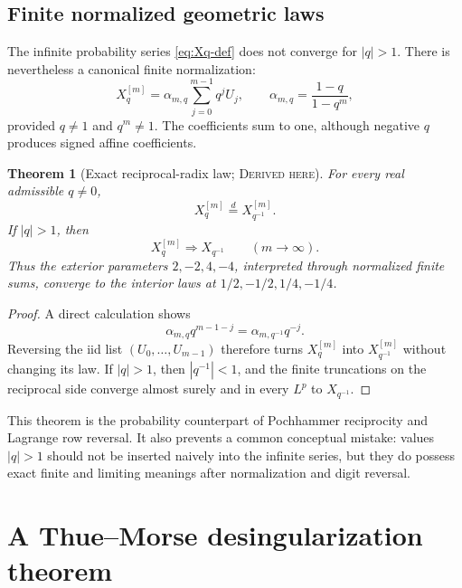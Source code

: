 \documentclass[11pt,oneside]{article}
\newtheorem{theorem}{Theorem}[section]
\theoremstyle{definition}
\theoremstyle{remark}
\newcommand{\Derived}{\textsc{Derived here}}
\begin{document}
\subsection{Finite normalized geometric laws}
The infinite probability series \eqref{eq:Xq-def} does not converge for
\(|q|>1\).  There is nevertheless a canonical finite normalization:
\begin{equation}\label{eq:finite-law}
 X_q^{[m]}=\alpha_{m,q}\sum_{j=0}^{m-1}q^jU_j,
 \qquad
 \alpha_{m,q}=\frac{1-q}{1-q^m},
\end{equation}
provided \(q\ne1\) and \(q^m\ne1\).  The coefficients sum to one, although
negative \(q\) produces signed affine coefficients.

\begin{theorem}[Exact reciprocal-radix law; \Derived]\label{thm:finite-reciprocal}
For every real admissible \(q\ne0\),
\begin{equation}\label{eq:finite-reciprocal}
 X_q^{[m]}\stackrel d=X_{q^{-1}}^{[m]}.
\end{equation}
If \(|q|>1\), then
\begin{equation}\label{eq:outside-limit}
 X_q^{[m]}\Longrightarrow X_{q^{-1}}
 \qquad(m\to\infty).
\end{equation}
Thus the exterior parameters \(2,-2,4,-4\), interpreted through normalized
finite sums, converge to the interior laws at \(1/2,-1/2,1/4,-1/4\).
\end{theorem}

\begin{proof}
A direct calculation shows
\[
 \alpha_{m,q}q^{m-1-j}=\alpha_{m,q^{-1}}q^{-j}.
\]
Reversing the iid list \((U_0,\ldots,U_{m-1})\) therefore turns
\(X_q^{[m]}\) into \(X_{q^{-1}}^{[m]}\) without changing its law.  If
\(|q|>1\), then \(|q^{-1}|<1\), and the finite truncations on the reciprocal
side converge almost surely and in every \(L^p\) to \(X_{q^{-1}}\).
\end{proof}

This theorem is the probability counterpart of Pochhammer reciprocity and
Lagrange row reversal.  It also prevents a common conceptual mistake: values
\(|q|>1\) should not be inserted naively into the infinite series, but they do
possess exact finite and limiting meanings after normalization and digit
reversal.

\section{A Thue--Morse desingularization theorem}
\end{document}
